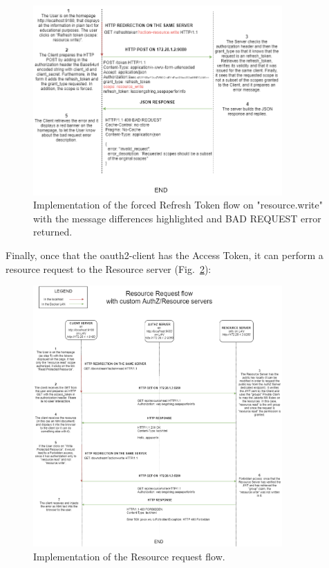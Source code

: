 \documentclass[a4paper,12pt]{article}
\def\myfig#1{Fig.~#1\xspace}
\begin{document}
\begin{figure}[ht]
    \centering
    \includegraphics[width=0.85\textwidth]{figures/flow_refresh3.png}
    \caption{Implementation of the forced Refresh Token flow on "resource.write" with the message differences highlighted and BAD REQUEST error returned.}
    \label{fig:refresh3}
\end{figure}

Finally, once that the oauth2-client has the Access Token, it can perform a resource request to the Resource server (\myfig{\ref{fig:resource}}):

\begin{figure}[ht]
    \centering
    \includegraphics[width=0.85\textwidth]{figures/flow_resource.png}
    \caption{Implementation of the Resource request flow.}
    \label{fig:resource}
\end{figure}
\end{document}
